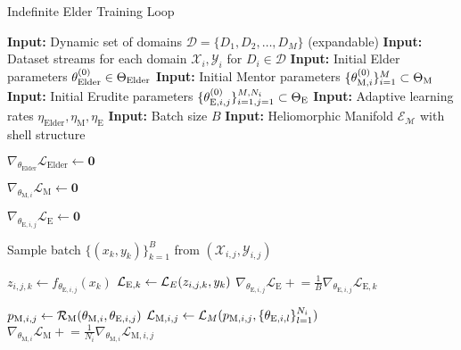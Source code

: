 \begin{algorithm}
\caption{Indefinite Elder Training Loop}
\begin{algorithmic}[1]
\State \textbf{Input:} Dynamic set of domains $\mathcal{D} = \{D_1, D_2, \ldots, D_M\}$ (expandable)
\State \textbf{Input:} Dataset streams for each domain $\mathcal{X}_i, \mathcal{Y}_i$ for $D_i \in \mathcal{D}$
\State \textbf{Input:} Initial Elder parameters $\theta_{\text{Elder}}^{(0)} \in \Theta_{\text{Elder}}$
\State \textbf{Input:} Initial Mentor parameters $\{\theta_{\text{M},i}^{(0)}\}_{i=1}^M \subset \Theta_{\text{M}}$
\State \textbf{Input:} Initial Erudite parameters $\{\theta_{\text{E},i,j}^{(0)}\}_{i=1,j=1}^{M,N_i} \subset \Theta_{\text{E}}$
\State \textbf{Input:} Adaptive learning rates $\eta_{\text{Elder}}, \eta_{\text{M}}, \eta_{\text{E}}$
\State \textbf{Input:} Batch size $B$
\State \textbf{Input:} Heliomorphic Manifold $\mathcal{E}_{\mathcal{M}}$ with shell structure

 
    \State $\nabla_{\theta_{\text{Elder}}} \mathcal{L}_{\text{Elder}} \gets \mathbf{0}$ 
    
        \State $\nabla_{\theta_{\text{M},i}} \mathcal{L}_{\text{M}} \gets \mathbf{0}$ 
        
         
            \State $\nabla_{\theta_{\text{E},i,j}} \mathcal{L}_{\text{E}} \gets \mathbf{0}$ 
            
            \State Sample batch $\{(x_k, y_k)\}_{k=1}^B$ from $(\mathcal{X}_{i,j}, \mathcal{Y}_{i,j})$
            
                \State $z_{i,j,k} \gets f_{\theta_{\text{E},i,j}}(x_k)$ 
                \State $\mathcal{L}_{\text{E},k} \gets \mathcal{L}_E(z_{i,j,k}, y_k)$ 
                \State $\nabla_{\theta_{\text{E},i,j}} \mathcal{L}_{\text{E}} \mathrel{+}= \frac{1}{B} \nabla_{\theta_{\text{E},i,j}} \mathcal{L}_{\text{E},k}$ 
            \EndFor
            
            \State $p_{\text{M},i,j} \gets \mathcal{R}_{\text{M}}(\theta_{\text{M},i}, \theta_{\text{E},i,j})$ 
            \State $\mathcal{L}_{\text{M},i,j} \gets \mathcal{L}_M(p_{\text{M},i,j}, \{\theta_{\text{E},i,l}\}_{l=1}^{N_i})$ 
            \State $\nabla_{\theta_{\text{M},i}} \mathcal{L}_{\text{M}} \mathrel{+}= \frac{1}{N_i} \nabla_{\theta_{\text{M},i}} \mathcal{L}_{\text{M},i,j}$ 
        \EndFor
        

\end{algorithmic}
\end{algorithm}
